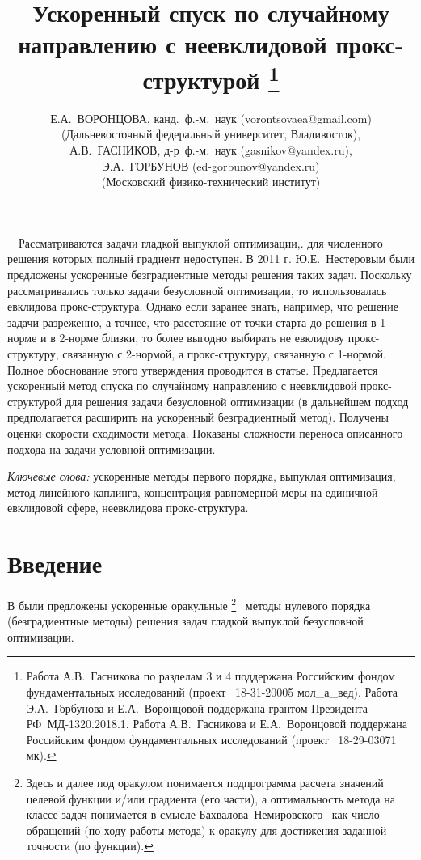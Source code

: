 \documentclass[11pt]{article}
\title{%
	Ускоренный спуск по случайному направлению 
	с неевклидовой прокс-структурой 
\footnote{Работа А.В.~Гасникова по разделам 3 и 4 поддержана Российским фондом фундаментальных исследований (проект \No~18-31-20005 мол\_а\_вед). Работа Э.А.~Горбунова и Е.А.~Воронцовой поддержана грантом Президента РФ~МД-1320.2018.1. Работа А.В.~Гасникова и  Е.А.~Воронцовой поддержана Российским фондом фундаментальных исследований (проект \No~18-29-03071 мк).}%
}%
\author{Е.А.~ВОРОНЦОВА, канд.~ф.-м.~наук (\textrm{vorontsovaea@gmail.com}) \\
(Дальневосточный федеральный университет, Владивосток),
	\\
	А.В.~ГАСНИКОВ, д-р~ф.-м.~наук (\textrm{gasnikov@yandex.ru}), \\
	Э.А.~ГОРБУНОВ (\textrm{ed-gorbunov@yandex.ru})
	\\
	(Московский физико-технический институт) }
\date{}
\begin{document}
	
	\maketitle
\small{$\quad$Рассматриваются задачи гладкой выпуклой оптимизации,.
для численного решения которых полный градиент недоступен.
В 2011 г. Ю.Е.~Нестеровым были предложены ускоренные безградиентные методы решения таких задач. 
Поскольку рассматривались только задачи безусловной оптимизации, то использовалась евклидова прокс-структура. Однако если заранее знать, например, что решение задачи разреженно, а точнее, что расстояние от точки старта до решения в 1-норме и в 2-норме близки, то более выгодно выбирать не евклидову прокс-структуру, связанную с 2-нормой, а прокс-структуру, связанную с 1-нормой. 
Полное обоснование этого утверждения проводится в статье.
Предлагается
ускоренный метод спуска по случайному направлению с неевклидовой прокс-структурой для решения задачи безусловной оптимизации (в дальнейшем подход
предполагается расширить на ускоренный безградиентный метод).
Получены оценки скорости сходимости метода.
Показаны сложности переноса 
описанного подхода на задачи условной оптимизации.
}
	
	
	
	\textit{Ключевые слова:} ускоренные методы первого порядка, выпуклая оптимизация, метод линейного каплинга, концентрация равномерной меры на единичной евклидовой сфере, неевклидова прокс-структура.

	\section{Введение}
	В \cite{nest} были предложены ускоренные оракульные \footnote{Здесь и далее под 
	оракулом понимается подпрограмма расчета
	значений целевой функции и/или градиента (его части),
	а 	оптимальность метода на классе задач понимается в смысле Бахвалова--Немировского~\cite{Nemir} как число обращений (по ходу работы метода) к оракулу для достижения заданной точности (по функции). } $\,$ методы нулевого порядка (безградиентные методы) решения задач гладкой выпуклой безусловной оптимизации.
	
\end{document}
